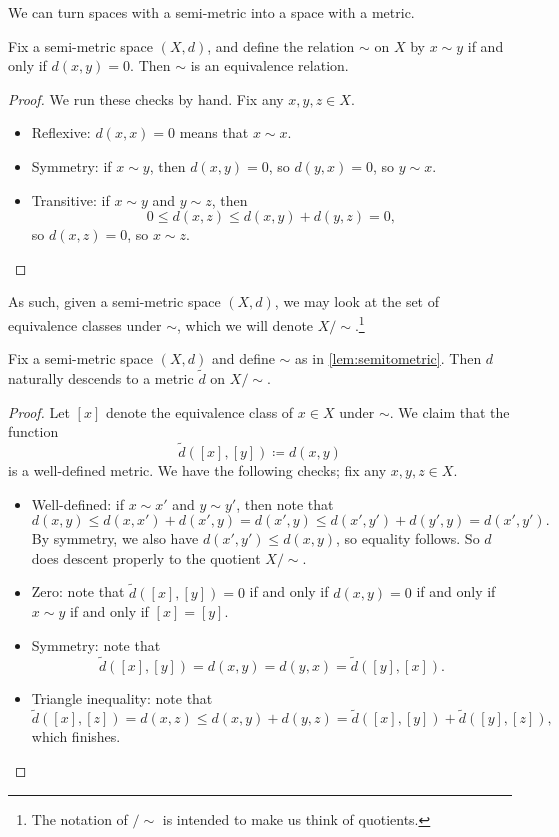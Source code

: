 \documentclass[../notes.tex]{subfiles}
\begin{document}
We can turn spaces with a semi-metric into a space with a metric.
\begin{lemma} \label{lem:semitometric}
	Fix a semi-metric space $(X,d)$, and define the relation $\sim$ on $X$ by $x\sim y$ if and only if $d(x,y)=0$. Then $\sim$ is an equivalence relation.
\end{lemma}
\begin{proof}
	We run these checks by hand. Fix any $x,y,z\in X$.
	\begin{itemize}
		\item Reflexive: $d(x,x)=0$ means that $x\sim x$.
		\item Symmetry: if $x\sim y$, then $d(x,y)=0$, so $d(y,x)=0$, so $y\sim x$.
		\item Transitive: if $x\sim y$ and $y\sim z$, then
		\[0\le d(x,z)\le d(x,y)+d(y,z)=0,\]
		so $d(x,z)=0$, so $x\sim z$.
		\qedhere
	\end{itemize}
\end{proof}
As such, given a semi-metric space $(X,d)$, we may look at the set of equivalence classes under $\sim$, which we will denote $X/{\sim}$.\footnote{The notation of $/{\sim}$ is intended to make us think of quotients.}
\begin{proposition}
	Fix a semi-metric space $(X,d)$ and define $\sim$ as in \autoref{lem:semitometric}. Then $d$ naturally descends to a metric $\widetilde d$ on $X/{\sim}$.
\end{proposition}
\begin{proof}
	Let $[x]$ denote the equivalence class of $x\in X$ under $\sim$. We claim that the function
	\[\widetilde d([x],[y])\coloneqq d(x,y)\]
	is a well-defined metric. We have the following checks; fix any $x,y,z\in X$.
	\begin{itemize}
		\item Well-defined: if $x\sim x'$ and $y\sim y'$, then note that
		\[d(x,y)\le d(x,x')+d(x',y)=d(x',y)\le d(x',y')+d(y',y)=d(x',y').\]
		By symmetry, we also have $d(x',y')\le d(x,y)$, so equality follows. So $d$ does descent properly to the quotient $X/{\sim}$.
		\item Zero: note that $\widetilde d([x],[y])=0$ if and only if $d(x,y)=0$ if and only if $x\sim y$ if and only if $[x]=[y]$.
		\item Symmetry: note that
		\[\widetilde d([x],[y])=d(x,y)=d(y,x)=\widetilde d([y],[x]).\]
		\item Triangle inequality: note that
		\[\widetilde d([x],[z])=d(x,z)\le d(x,y)+d(y,z)=\widetilde d([x],[y])+\widetilde d([y],[z]),\]
		which finishes.
		\qedhere
	\end{itemize}
\end{proof}
\end{document}
